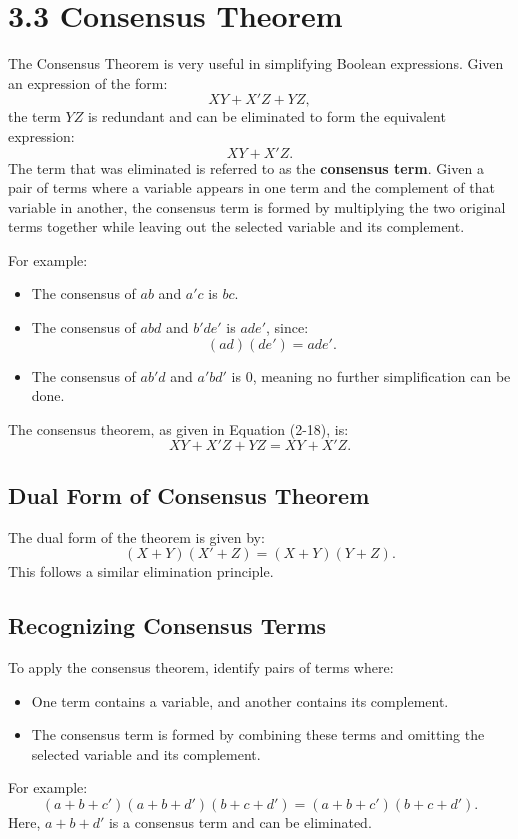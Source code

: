 \section*{3.3 Consensus Theorem}

The Consensus Theorem is very useful in simplifying Boolean expressions. Given an expression of the form:
\[
XY + X'Z + YZ,
\]
the term \( YZ \) is redundant and can be eliminated to form the equivalent expression:
\[
XY + X'Z.
\]
The term that was eliminated is referred to as the \textbf{consensus term}. Given a pair of terms where a variable appears in one term and the complement of that variable in another, the consensus term is formed by multiplying the two original terms together while leaving out the selected variable and its complement.

For example:
\begin{itemize}
    \item The consensus of \( ab \) and \( a'c \) is \( bc \).
    \item The consensus of \( abd \) and \( b'de' \) is \( ade' \), since:
    \[
    (ad)(de') = ade'.
    \]
    \item The consensus of \( ab'd \) and \( a'bd' \) is \( 0 \), meaning no further simplification can be done.
\end{itemize}

The consensus theorem, as given in Equation (2-18), is:
\[
XY + X'Z + YZ = XY + X'Z.
\]

\subsection{Dual Form of Consensus Theorem}
The dual form of the theorem is given by:
\[
(X + Y)(X' + Z) = (X + Y)(Y + Z).
\]
This follows a similar elimination principle.

\subsection{Recognizing Consensus Terms}
To apply the consensus theorem, identify pairs of terms where:
\begin{itemize}
    \item One term contains a variable, and another contains its complement.
    \item The consensus term is formed by combining these terms and omitting the selected variable and its complement.
\end{itemize}

For example:
\[
(a + b + c')(a + b + d')(b + c + d') = (a + b + c')(b + c + d').
\]
Here, \( a + b + d' \) is a consensus term and can be eliminated.

